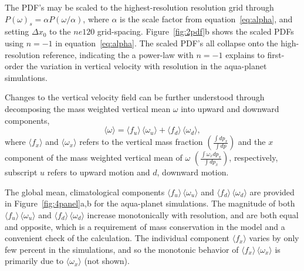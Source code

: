 The PDF's may be scaled to the highest-resolution resolution grid through $P(\omega)_s = \alpha P (\omega / \alpha)$, where $\alpha$ is the scale factor from equation~\ref{eq:alpha}, and setting $\Delta x_0$ to the $ne120$ grid-spacing. Figure~\ref{fig:2pdf}b shows the scaled PDFs using $n=-1$ in equation~\ref{eq:alpha}. The scaled PDF's all collapse onto the high-resolution reference, indicating the a power-law with $n=-1$ explains to first-order the variation in vertical velocity with resolution in the aqua-planet simulations. 

Changes to the vertical velocity field can be further understood through decomposing the mass weighted vertical mean $\omega$ into upward and downward components,
\begin{equation}
\langle \omega \rangle =\langle f_{u} \rangle \, \langle \omega_{u} \rangle + \langle f_{d} \rangle \, \langle \omega_{d} \rangle, \label{eq:omega}
\end{equation}
where $\langle f_x \rangle$ and $\langle \omega_x \rangle$ refers to the vertical mass fraction $ \left( \frac{\int dp_x}{\int dp} \right)$ and the $x$ component of the mass weighted vertical mean of $\omega$ $ \left( \frac{\int \omega_x dp_x}{\int dp_x} \right)$, respectively, subscript $u$ refers to upward motion and $d$, downward motion.

The global mean, climatological components $\langle f_{u} \rangle \, \langle \omega_{u} \rangle$ and $\langle f_{d} \rangle \, \langle \omega_{d} \rangle$ are provided in Figure~\ref{fig:4panel}a,b for the aqua-planet simulations. The magnitude of both $\langle f_{u} \rangle \, \langle \omega_{u} \rangle$ and $\langle f_{d} \rangle \, \langle \omega_{d} \rangle$ increase monotonically with resolution, and are both equal and opposite, which is a requirement of mass conservation in the model and a convenient check of the calculation. The individual component $\langle f_{x} \rangle$ varies by only few percent in the simulations, and so the monotonic behavior of $\langle f_{x} \rangle \, \langle \omega_{x} \rangle$ is primarily due to $ \langle \omega_{x} \rangle$ (not shown).

